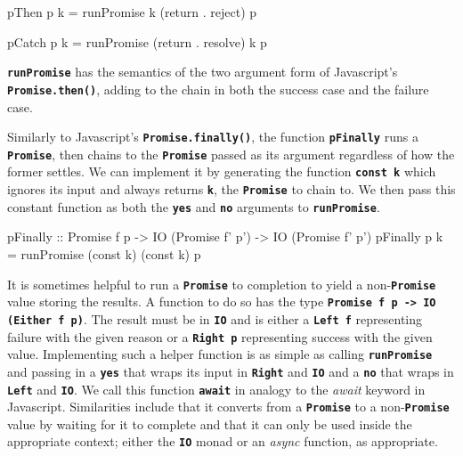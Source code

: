 \documentclass[12pt, english, letterpaper]{kuthesis}
\newcommand{\lit}[1]{\textbf{\texttt{#1}}}
\begin{document}
\begin{code}
pThen p k = runPromise k (return . reject) p

pCatch p k = runPromise (return . resolve) k p  
\end{code}
\lit{runPromise} has the semantics of the two argument form of Javascript's \lit{Promise.then()}, adding to the chain in both the success case and the failure case. 

Similarly to Javascript's \lit{Promise.finally()}, the function \lit{pFinally} runs a \lit{Promise}, then chains to the \lit{Promise} passed as its argument regardless of how the former settles.  We can implement it by generating the function \lit{const k} which ignores its input and always returns \lit{k}, the \lit{Promise} to chain to.  We then pass this constant function as both the \lit{yes} and \lit{no} arguments to \lit{runPromise}.

\begin{code}
pFinally :: Promise f p
         -> IO (Promise f' p')
         -> IO (Promise f' p')
pFinally p k = runPromise (const k) (const k) p
\end{code}

It is sometimes helpful to run a \lit{Promise} to completion to yield a non-\lit{Promise} value storing the results.  A function to do so has the type \lit{Promise f p -> IO (Either f p)}.  The result must be in \lit{IO} and is either a \lit{Left f} representing failure with the given reason or a \lit{Right p} representing success with the given value.  Implementing such a helper function is as simple as calling \lit{runPromise} and passing in a \lit{yes} that wraps its input in \lit{Right} and \lit{IO} and a \lit{no} that wraps in \lit{Left} and \lit{IO}.  We call this function \lit{await} in analogy to the \emph{await} keyword in Javascript.  Similarities include that it converts from a \lit{Promise} to a non-\lit{Promise} value by waiting for it to complete and that it can only be used inside the appropriate context; either the \lit{IO} monad or an \emph{async} function, as appropriate.
\end{document}
